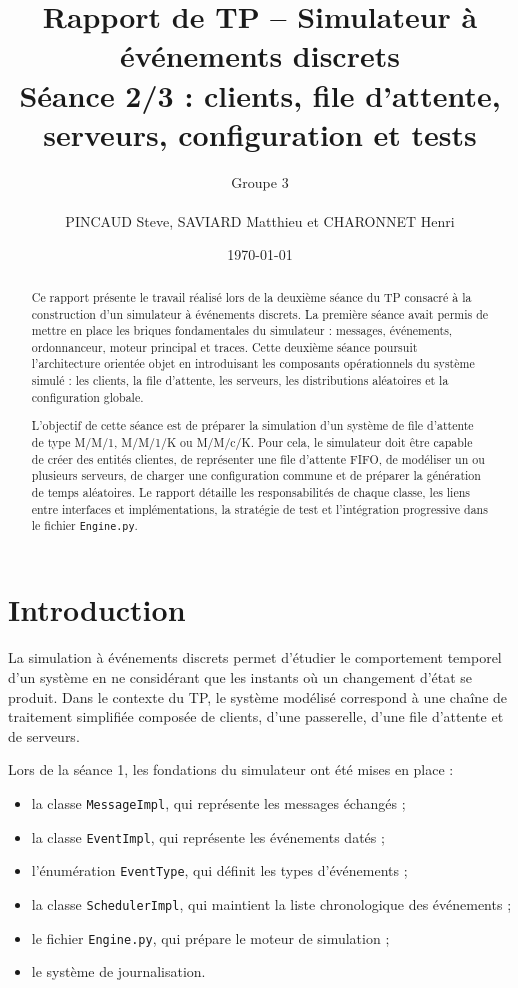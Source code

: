 \documentclass{article}
\title{
Rapport de TP -- Simulateur à événements discrets\\
\large Séance 2/3 : clients, file d’attente, serveurs, configuration et tests
}
\author{
Groupe 3 \\ \\
PINCAUD Steve, SAVIARD Matthieu et CHARONNET Henri
}
\date{\today}
\begin{document}
\maketitle

\begin{abstract}
Ce rapport présente le travail réalisé lors de la deuxième séance du TP consacré à la construction d’un simulateur à événements discrets. La première séance avait permis de mettre en place les briques fondamentales du simulateur : messages, événements, ordonnanceur, moteur principal et traces. Cette deuxième séance poursuit l’architecture orientée objet en introduisant les composants opérationnels du système simulé : les clients, la file d’attente, les serveurs, les distributions aléatoires et la configuration globale.

L’objectif de cette séance est de préparer la simulation d’un système de file d’attente de type M/M/1, M/M/1/K ou M/M/c/K. Pour cela, le simulateur doit être capable de créer des entités clientes, de représenter une file d’attente FIFO, de modéliser un ou plusieurs serveurs, de charger une configuration commune et de préparer la génération de temps aléatoires. Le rapport détaille les responsabilités de chaque classe, les liens entre interfaces et implémentations, la stratégie de test et l’intégration progressive dans le fichier \texttt{Engine.py}.
\end{abstract}

\tableofcontents
\newpage

\section{Introduction}

La simulation à événements discrets permet d’étudier le comportement temporel d’un système en ne considérant que les instants où un changement d’état se produit. Dans le contexte du TP, le système modélisé correspond à une chaîne de traitement simplifiée composée de clients, d’une passerelle, d’une file d’attente et de serveurs.

Lors de la séance 1, les fondations du simulateur ont été mises en place :
\begin{itemize}[leftmargin=*]
    \item la classe \texttt{MessageImpl}, qui représente les messages échangés ;
    \item la classe \texttt{EventImpl}, qui représente les événements datés ;
    \item l’énumération \texttt{EventType}, qui définit les types d’événements ;
    \item la classe \texttt{SchedulerImpl}, qui maintient la liste chronologique des événements ;
    \item le fichier \texttt{Engine.py}, qui prépare le moteur de simulation ;
    \item le système de journalisation.
\end{itemize}
\end{document}
